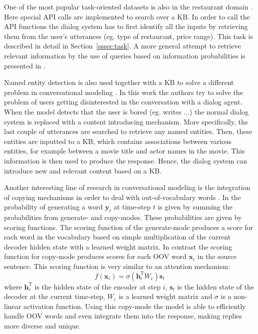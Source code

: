 \documentclass[12pt]{article}
\begin{document}
One of the most popular task-oriented datasets is also in the restaurant domain \cite{Joshi:2017}. Here special API calls are implemented to search over a KB. In order to call the API functions the dialog system has to first identify all the inputs by retrieving them from the user's utterances (eg. type of restaurant, price range). This task is described in detail in Section~\ref{sssec:task}. A more general attempt to retrieve relevant information by the use of queries based on information probabilities is presented in \cite{Yin:2017}.

Named entity detection is also used together with a KB to solve a different problem in conversational modeling \cite{stalemate:2016}. In this work the authors try to solve the problem of users getting disinterested in the conversation with a dialog agent. When the model detects that the user is bored (eg. writes ...) the normal dialog system is replaced with a content introducing mechanism. More specifically, the last couple of utterances are searched to retrieve any named entities. Then, these entities are inputted to a KB, which contains associations between various entities, for example between a movie title and actor names in the movie. This information is then used to produce the response. Hence, the dialog system can introduce new and relevant content based on a KB.

Another interesting line of research in conversational modeling is the integration of copying mechanisms in order to deal with out-of-vocabulary words \cite{Eric:2017,Gu:2016}. In \cite{Gu:2016} the probability of generating a word \(\bm{y}_t\) at time-step \(t\) is given by summing the probabilities from generate- and copy-modes. These probabilities are given by scoring functions. The scoring function of the generate-mode produces a score for each word in the vocabulary based on simple multiplication of the current decoder hidden state with a learned weight matrix. In contrast the scoring function for copy-mode produces scores for each OOV word \(\bm{x}_i\) in the source sentence. This scoring function is very similar to an attention mechanism:
\begin{equation}
f(\bm{x}_i)=\sigma(\bm{h}_{i}^{\mathsf{T}}W_c)\bm{s}_t
\end{equation}
where \(\bm{h}_{i}^{\mathsf{T}}\) is the hidden state of the encoder at step \(i\), \(\bm{s}_t\) is the hidden state of the decoder at the current time-step, \(W_c\) is a learned weight matrix and \(\sigma\) is a non-linear activation function. Using this copy-mode the model is able to efficiently handle OOV words and even integrate them into the response, making replies more diverse and unique.
\end{document}

